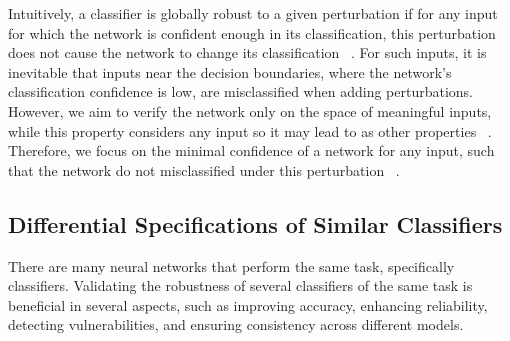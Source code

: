 Intuitively, a classifier is globally robust to a given perturbation if for any input for which the network is confident enough in its classification, this perturbation does not cause the network to change its classification ~\cite{GLOBALROBUSNN}. For such inputs, it is inevitable that inputs near the decision boundaries, where the network’s classification confidence is low, are misclassified when adding perturbations. However, we aim to verify the network only on the space of meaningful inputs, while this property considers any input so it may lead to as other properties ~\cite{Reluplex,EFCIENTGLOBALROBU}. Therefore, we focus on the minimal confidence of a network for any input, such that the network do not misclassified under this perturbation ~\cite{VHAGAR}.
     
\subsection{Differential Specifications of Similar Classifiers}
There are many neural networks that perform the same task, specifically classifiers. Validating the robustness of several classifiers of the same task is beneficial in several aspects, such as improving accuracy, enhancing reliability, detecting vulnerabilities, and ensuring consistency across different models.

